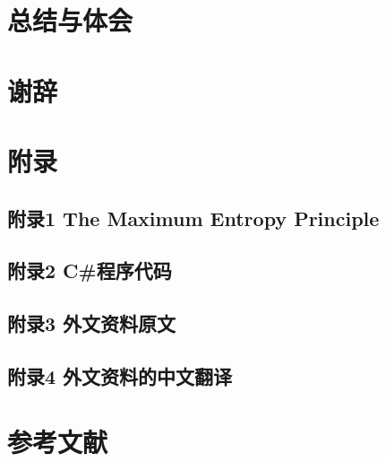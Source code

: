 
\backmatter %

\chapter{总结与体会}
\chapter{谢辞}

\chapter{附录}

\setcounter{secnumdepth}{0}   %
\section{附录1 The Maximum Entropy Principle}

%

\section{附录2 C\#程序代码}
\section{附录3 外文资料原文}
\section{附录4 外文资料的中文翻译}


\chapter{参考文献}


%
%

